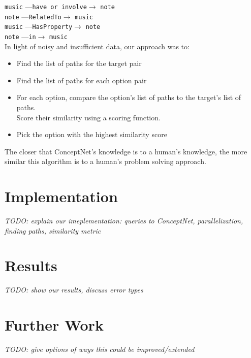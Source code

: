 \documentclass[11pt]{article}
\begin{document}
\verb|music| ---\verb|have or involve|$\rightarrow$ \verb|note|\\
\verb|note| ---\verb|RelatedTo|$\rightarrow$ \verb|music|\\
\verb|music| ---\verb|HasProperty|$\rightarrow$ \verb|note|\\
\verb|note| ---\verb|in|$\rightarrow$ \verb|music|\\

In light of noisy and insufficient data, our approach was to:

\begin{itemize}
\item Find the list of paths for the target pair
\item Find the list of paths for each option pair
\item For each option, compare the option's list of paths to the target's list of paths.\\ Score their similarity using a scoring function.
\item Pick the option with the highest similarity score
\end{itemize}

The closer that ConceptNet's knowledge is to a human's knowledge, the more similar this algorithm is to a human's problem solving approach.

\section{Implementation}
\textit{TODO: explain our imeplementation: queries to ConceptNet, parallelization, finding paths, similarity metric}

\section{Results}
\textit{TODO: show our results, discuss error types}

\section{Further Work}
\textit{TODO: give options of ways this could be improved/extended}
\end{document}
